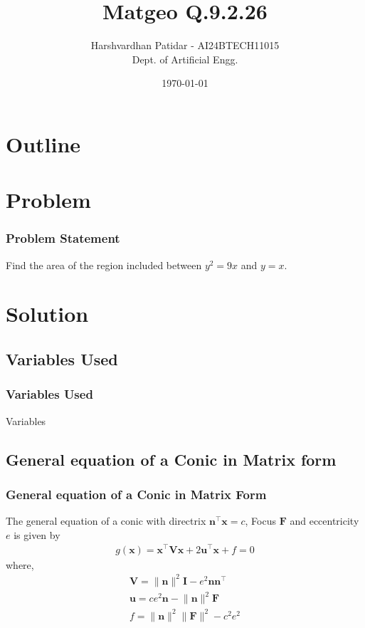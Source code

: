 \documentclass{beamer}
\title{Matgeo Q.9.2.26}
\author{Harshvardhan Patidar - AI24BTECH11015\\Dept. of Artificial Engg.}
\date{\today}
\providecommand{\brak}[1]{\ensuremath{\left(#1\right)}}
\theoremstyle{remark}
\providecommand{\norm}[1]{\lVert#1\rVert}
\let\vec\mathbf
\numberwithin{equation}{section}
\begin{document}
\begin{frame}
\titlepage
\end{frame}

\section*{Outline}
\begin{frame}
\tableofcontents
\end{frame}
\section{Problem}
\begin{frame}
\frametitle{Problem Statement}
Find the area of the region included between $y^2 = 9x$ and $y=x$.
\end{frame}


\section{Solution}


\subsection{Variables Used}
\begin{frame}
\frametitle{Variables Used}
  \begin{table}[ht]
    \begin{adjustbox}{width=0.8\framewidth}
     
    \end{adjustbox}
    \vspace{0.5cm}
    \caption{Variables}
    \label{table}
  \end{table}
\end{frame}

\subsection{General equation of a Conic in Matrix form}
\begin{frame}
\frametitle{General equation of a Conic in Matrix Form}
  The general equation of a conic with directrix $\vec{n} ^{\top} \vec{x} = c$, Focus $\vec{F}$ and eccentricity $e$ is given by
  \begin{align}
		g\brak{\vec{x}}=\vec{x}^{\top}\vec{V}\vec{x}+2\vec{u}^{\top}\vec{x}+f=0 \label{gen_eq}
  \end{align}
  where,
  \begin{align}
		\vec{V}=\norm{\vec{n}}^2\vec{I}-e^2\vec{n}\vec{n}^{\top} \label{v_eq}\\
		\vec{u}=ce^2\vec{n}-\norm{\vec{n}}^2\vec{F}\\
		f=\norm{\vec{n}}^2\norm{\vec{F}}^2-c^2e^2
	\end{align} 
\end{frame}
\end{document}
